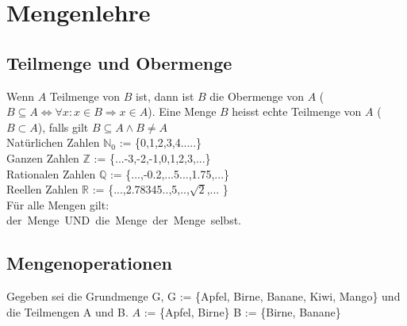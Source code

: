 \section{Mengenlehre}
\subsection*{Teilmenge und Obermenge}
Wenn $A$ Teilmenge von $B$ ist, dann ist $B$ die Obermenge von $A$ ($B\subseteq A\Leftrightarrow\forall x:x\in B\Rightarrow x\in A$).
Eine Menge $B$ heisst echte Teilmenge von $A$ ($B\subset A$), falls gilt $B\subseteq A\wedge B\neq A$\\

Natürlichen Zahlen $\mathbb{N}_0$ := \{0,1,2,3,4.....\}\\
Ganzen Zahlen  $\mathbb{Z}$ := \{...-3,-2,-1,0,1,2,3,...\}\\
Rationalen Zahlen  $\mathbb{Q}$ := \{...,-0.2,...5...,1.75,...\}\\
Reellen Zahlen   $\mathbb{R}$ := \{...,2.78345..,5,..,$\sqrt{2}$,... \}\\

Für alle Mengen gilt:\\ 
\varnothing \subseteq der\ Menge\ UND\ die\ Menge\ \subseteq der\ Menge\ selbst.\\

\subsection{Mengenoperationen} 
Gegeben sei die Grundmenge G, G := \{Apfel, Birne, Banane, Kiwi, Mango\} und die Teilmengen A und B.
$A$ := \{Apfel, Birne\} B := \{Birne, Banane\}

